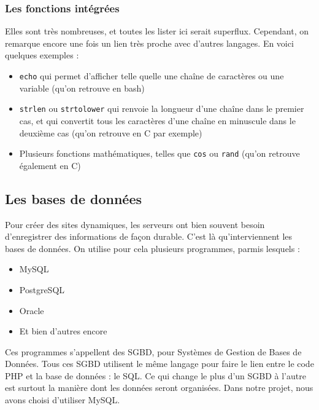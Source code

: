 \documentclass{article}
\begin{document}
\subsubsection{Les fonctions intégrées}
Elles sont très nombreuses, et toutes les lister ici serait superflux. Cependant, on remarque encore une fois un lien très proche avec d'autres langages. En voici quelques exemples :
\begin{itemize}
	\item \texttt{echo} qui permet d'afficher telle quelle une chaîne de caractères ou une variable (qu'on retrouve en bash)
	\item \texttt{strlen} ou \texttt{strtolower} qui renvoie la longueur d'une chaîne dans le premier cas, et qui convertit tous les caractères d'une chaîne en minuscule dans le deuxième cas (qu'on retrouve en C par exemple)
	\item Plusieurs fonctions mathématiques, telles que \texttt{cos} ou \texttt{rand} (qu'on retrouve également en C)
\end{itemize}

\subsection{Les bases de données}
Pour créer des sites dynamiques, les serveurs ont bien souvent besoin d'enregistrer des informations de façon durable. C'est là qu'interviennent les bases de données. On utilise pour cela plusieurs programmes, parmis lesquels :
\begin{itemize}
	\item MySQL
	\item PostgreSQL
	\item Oracle
	\item Et bien d'autres encore
\end{itemize}

Ces programmes s'appellent des SGBD, pour Systèmes de Gestion de Bases de Données. Tous ces SGBD utilisent le même langage pour faire le lien entre le code PHP et la base de données : le SQL. Ce qui change le plus d'un SGBD à l'autre est surtout la manière dont les données seront organisées. 
Dans notre projet, nous avons choisi d'utiliser MySQL.
\end{document}
